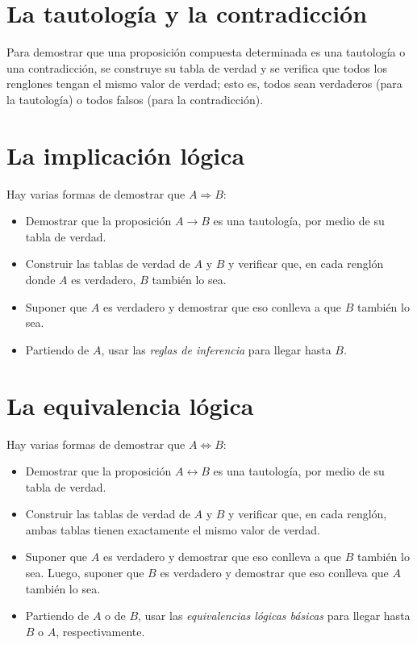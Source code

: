 \section{La tautología y la contradicción}

Para demostrar que una proposición compuesta determinada es una tautología o una contradicción, se construye su tabla de verdad y se verifica que todos los renglones tengan el mismo valor de verdad; esto es, todos sean verdaderos (para la tautología) o todos falsos (para la contradicción).
\newpage


\section{La implicación lógica}

Hay varias formas de demostrar que \(A\Rightarrow B\):
\begin{itemize}
  \item Demostrar que la proposición \(A\to B\) es una tautología, por medio de su tabla de verdad.
  \item Construir las tablas de verdad de \(A\) y \(B\) y verificar que, en cada renglón donde \(A\) es verdadero, \(B\) también lo sea.
  \item Suponer que \(A\) es verdadero y demostrar que eso conlleva a que \(B\) también lo sea.
  \item Partiendo de \(A\), usar las \emph{reglas de inferencia} para llegar hasta \(B\).
\end{itemize}



\section {La equivalencia lógica}

Hay varias formas de demostrar que \(A\Leftrightarrow B\):
\begin{itemize}
  \item Demostrar que la proposición \(A\leftrightarrow B\) es una tautología, por medio de su tabla de verdad.
  \item Construir las tablas de verdad de \(A\) y \(B\) y verificar que, en cada renglón, ambas tablas tienen exactamente el mismo valor de verdad.
  \item Suponer que \(A\) es verdadero y demostrar que eso conlleva a que \(B\) también lo sea.
  Luego, suponer que \(B\) es verdadero y demostrar que eso conlleva que \(A\) también lo sea.
  \item Partiendo de \(A\) o de \(B\), usar las \emph{equivalencias lógicas básicas} para llegar hasta \(B\) o \(A\), respectivamente.
\end{itemize}
\newpage



